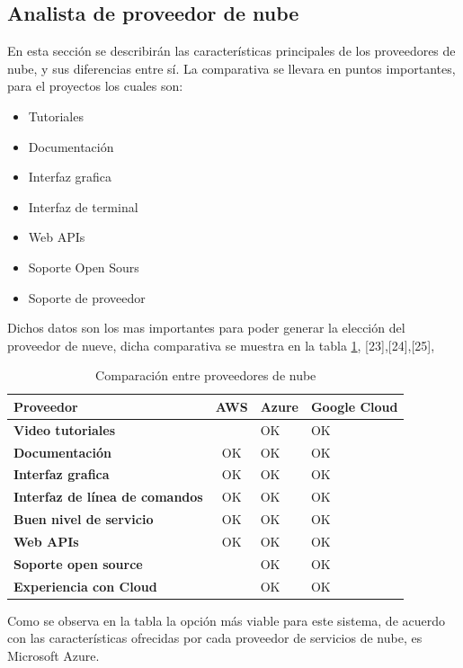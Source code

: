 \subsection{Analista de proveedor de nube}\label{cap:azure}
En esta sección se describirán las características principales de los proveedores de nube, y sus diferencias entre sí.
La comparativa se llevara en puntos importantes, para el proyectos los cuales son: 
\begin{itemize}
	\item Tutoriales
	\item Documentación
	\item Interfaz grafica 
	\item Interfaz de terminal 
	\item Web APIs
	\item Soporte Open Sours 
	\item Soporte de proveedor 
\end{itemize}
Dichos datos son los mas importantes para poder generar la elección del proveedor de nueve, dicha comparativa se muestra en la tabla \ref{tab:cloudNuve}, [23],[24],[25],

\begin{table}[H]
	\centering
	\caption{Comparación entre proveedores de nube}
	\begin{tabular}{|p{10.715em}|c|p{5.355em}|p{5.355em}|}
		\toprule
		\rowcolor[rgb]{ .125,  .216,  .392} \textcolor[rgb]{ 1,  1,  1}{\textbf{Proveedor}} & \multicolumn{1}{p{5.355em}|}{\textcolor[rgb]{ 1,  1,  1}{\textbf{AWS}}} & \textcolor[rgb]{ 1,  1,  1}{\textbf{Azure}} & \textcolor[rgb]{ 1,  1,  1}{\textbf{Google Cloud}} \\
		\midrule
		\textbf{Video tutoriales} &   & OK & OK \\
		\midrule
		\textbf{Documentación} & \multicolumn{1}{p{5.355em}|}{OK } & OK & OK \\
		\midrule
		\textbf{Interfaz grafica} & \multicolumn{1}{p{5.355em}|}{OK } & OK & OK \\
		\midrule
		\textbf{Interfaz de línea de comandos } & \multicolumn{1}{p{5.355em}|}{OK } & OK & OK \\
		\midrule
		\textbf{Buen nivel de servicio} & \multicolumn{1}{p{5.355em}|}{OK } & OK & OK \\
		\midrule
		\textbf{Web APIs} & \multicolumn{1}{p{5.355em}|}{OK } & OK & OK \\
		\midrule
		\textbf{Soporte open source} &   & OK & OK \\
		\midrule
		\textbf{Experiencia con Cloud } &   & OK  & OK  \\
		\bottomrule
	\end{tabular}%
	\label{tab:cloudNuve}%
\end{table}%
Como se observa en la tabla la opción más viable para este sistema, de acuerdo con las características ofrecidas por cada proveedor de servicios de nube, es Microsoft Azure. 


